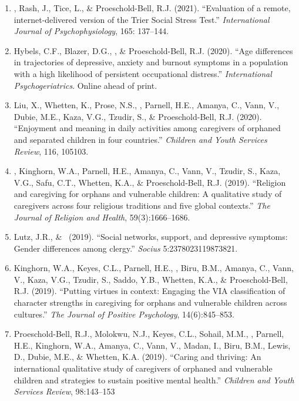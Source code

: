 \begin{enumerate}
\item \Eagle, Rash, J., Tice, L., \& Proeschold-Bell, R.J. (2021). ``Evaluation of a remote, internet-delivered version of the Trier Social Stress Test.'' \textit{International Journal of Psychophysiology}, 165: 137--144. 

\item Hybels, C.F., Blazer, D.G., \Eagle, \& Proeschold-Bell, R.J. (2020). ``Age differences in trajectories of depressive, anxiety and burnout symptoms in a population with a high likelihood of persistent occupational distress.'' \emph{International Psychogeriatrics}. Online ahead of print. 

\item Liu, X., Whetten, K., Prose, N.S., \Eagle, Parnell, H.E., Amanya, C., Vann, V., Dubie, M.E., Kaza, V.G., Tzudir, S., \& Proeschold-Bell, R.J. (2020). ``Enjoyment and meaning in daily activities among caregivers of orphaned and separated children in four countries.'' \emph{Children and Youth Services Review}, 116, 105103. 

\item \Eagle, Kinghorn, W.A., Parnell, H.E., Amanya, C., Vann, V., Tzudir, S., Kaza, V.G., Safu, C.T., Whetten, K.A., \& Proeschold-Bell, R.J. (2019). ``Religion and caregiving for orphans and vulnerable children: A qualitative study of caregivers across four religious traditions and five global contexts.'' \emph{The Journal of Religion and Health}, 59(3):1666--1686. 

\item Lutz, J.R., \& \Eagle\CS\ (2019). ``Social networks, support, and depressive symptoms: Gender differences among clergy.'' \emph{Socius} 5:2378023119873821. 

\item Kinghorn, W.A., Keyes, C.L., Parnell, H.E., \Eagle, Biru, B.M., Amanya, C., Vann, V., Kaza, V.G., Tzudir, S., Saddo, Y.B., Whetten, K.A., \& Proeschold-Bell, R.J. (2019). ``Putting virtues in context: Engaging the VIA classification of character strengths in caregiving for orphans and vulnerable children across cultures.'' \emph{The Journal of Positive Psychology}, 14(6):845--853. 

\item Proeschold-Bell, R.J., Molokwu, N.J., Keyes, C.L., Sohail, M.M., \Eagle, Parnell, H.E., Kinghorn, W.A., Amanya, C., Vann, V., Madan, I., Biru, B.M., Lewis, D., Dubie, M.E., \& Whetten, K.A. (2019). ``Caring and thriving: An international qualitative study of caregivers of orphaned and vulnerable children and strategies to sustain positive mental health.''  \emph{Children and Youth Services Review}, 98:143--153  


\end{enumerate}
